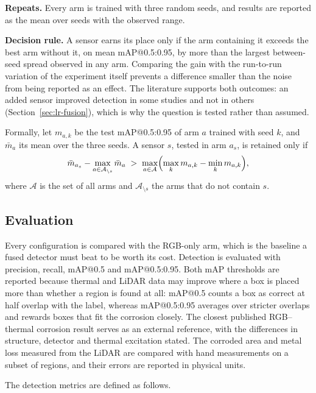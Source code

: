 \textbf{Repeats.} Every arm is trained with three random seeds, and results are
reported as the mean over seeds with the observed range.

\textbf{Decision rule.} A sensor earns its place only if the arm containing it
exceeds the best arm without it, on mean mAP@0.5:0.95, by more than the largest
between-seed spread observed in any arm. Comparing the gain with the run-to-run
variation of the experiment itself prevents a difference smaller than the noise
from being reported as an effect. The literature supports both outcomes: an
added sensor improved detection in some studies and not in others
(Section~\ref{sec:lr-fusion}), which is why the question is tested rather than
assumed.

Formally, let $m_{a,k}$ be the test mAP@0.5:0.95 of arm $a$ trained with seed
$k$, and $\bar{m}_a$ its mean over the three seeds. A sensor $s$, tested in
arm $a_s$, is retained only if
\begin{equation}
\bar{m}_{a_s} - \max_{a \in \mathcal{A}_{\setminus s}} \bar{m}_a \;>\;
\max_{a \in \mathcal{A}} \Bigl( \max_k m_{a,k} - \min_k m_{a,k} \Bigr),
\label{eq:decision}
\end{equation}
where $\mathcal{A}$ is the set of all arms and $\mathcal{A}_{\setminus s}$ the
arms that do not contain $s$.

\subsection{Evaluation}
\label{sec:evaluation}

Every configuration is compared with the RGB-only arm, which is the baseline a
fused detector must beat to be worth its cost. Detection is evaluated with
precision, recall, mAP@0.5 and mAP@0.5:0.95. Both mAP thresholds are reported
because thermal and LiDAR data may improve where a box is placed more than
whether a region is found at all: mAP@0.5 counts a box as correct at half
overlap with the label, whereas mAP@0.5:0.95 averages over stricter overlaps and
rewards boxes that fit the corrosion closely.
The closest published RGB--thermal corrosion result \citep{Lim2021} serves as an
external reference, with the differences in structure, detector and thermal
excitation stated. The corroded area and metal loss measured from the LiDAR are
compared with hand measurements on a subset of regions, and their errors are
reported in physical units.

The detection metrics are defined as follows.

